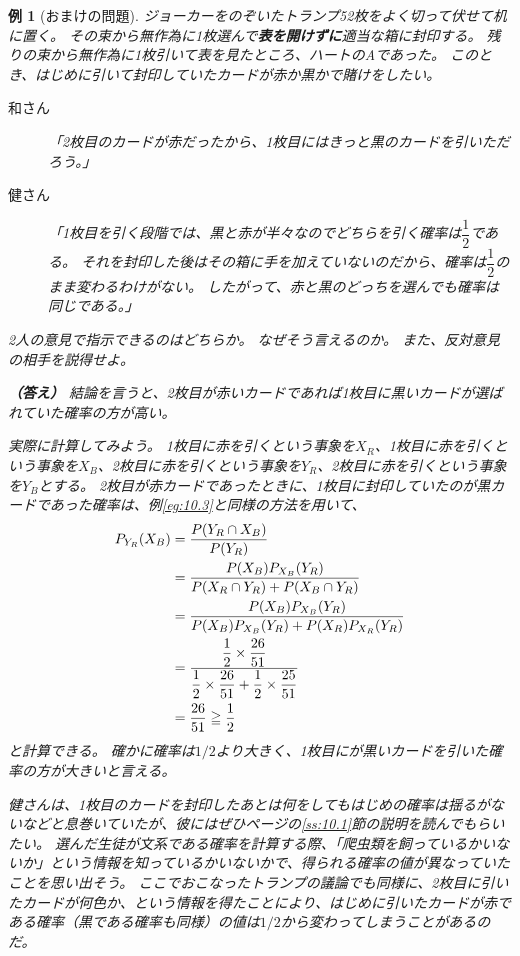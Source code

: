 \documentclass[luatexja,fontsize=12pt]{jlreq}\usepackage{ifthen}\newcounter{enlarge}\setcounter{enlarge}{1}
\newtheorem{eg}{例}
\begin{document}
\begin{eg}[おまけの問題]
ジョーカーをのぞいたトランプ52枚をよく切って伏せて机に置く。
その束から無作為に1枚選んで\textbf{表を開けずに}適当な箱に封印する。
残りの束から無作為に1枚引いて表を見たところ、ハートのAであった。
このとき、はじめに引いて封印していたカードが赤か黒かで賭けをしたい。
\begin{description}
\item[和さん]  「2枚目のカードが赤だったから、1枚目にはきっと黒のカードを引いただろう。」
\item[健さん]  「1枚目を引く段階では、黒と赤が半々なのでどちらを引く確率は$\dfrac{1}{2}$である。
それを封印した後はその箱に手を加えていないのだから、確率は$\dfrac{1}{2}$のまま変わるわけがない。
したがって、赤と黒のどっちを選んでも確率は同じである。」
\end{description}

2人の意見で指示できるのはどちらか。
なぜそう言えるのか。
また、反対意見の相手を説得せよ。

\textbf{（答え）}
結論を言うと、2枚目が赤いカードであれば1枚目に黒いカードが選ばれていた確率の方が高い。

実際に計算してみよう。
1枚目に赤を引くという事象を$X_R$、1枚目に赤を引くという事象を$X_B$、2枚目に赤を引くという事象を$Y_R$、2枚目に赤を引くという事象を$Y_B$とする。
2枚目が赤カードであったときに、1枚目に封印していたのが黒カードであった確率は、例\ref{eg:10.3}と同様の方法を用いて、
\begin{align}
P_{Y_R } (X_B ) &= \frac{P(Y_R \cap X_B )}{P(Y_R )} \notag \\
&= \frac{P(X_B ) P_{X_B} (Y_R )}{P(X_R \cap Y_R) + P(X_B \cap Y_R) } \notag \\
&= \frac{P(X_B ) P_{X_B} (Y_R )}{P(X_B ) P_{X_B} (Y_R ) + P(X_R ) P_{X_R} (Y_R ) } \notag \\
&= \frac{\dfrac{1}{2} \times \dfrac{26}{51} }{\dfrac{1}{2} \times \dfrac{26}{51} + \dfrac{1}{2} \times \dfrac{25}{51} } \notag \\
&= \frac{26}{51} \geqq \frac{1}{2}
\end{align}
と計算できる。
確かに確率は$1/2$より大きく、1枚目にが黒いカードを引いた確率の方が大きいと言える。

健さんは、1枚目のカードを封印したあとは何をしてもはじめの確率は揺るがないなどと息巻いていたが、彼にはぜひ\pageref{ss:10.1}ページの\ref{ss:10.1}節の説明を読んでもらいたい。
選んだ生徒が文系である確率を計算する際、「爬虫類を飼っているかいないか」という情報を知っているかいないかで、得られる確率の値が異なっていたことを思い出そう。
ここでおこなったトランプの議論でも同様に、2枚目に引いたカードが何色か、という情報を得たことにより、はじめに引いたカードが赤である確率（黒である確率も同様）の値は$1/2$から変わってしまうことがあるのだ。
\end{eg}
\end{document}
